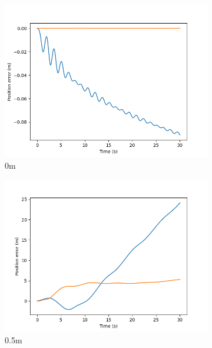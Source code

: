 \documentclass[class=article, crop=false]{standalone}
\begin{document}
\begin{figure}
    \centering
    \begin{subfigure}[b]{0.48\textwidth}
        \centering
        \includegraphics{scenario1/rov-100m/0.0m/usv_pos_error_uncontrolled}
        \caption{0m}
        \label{}
    \end{subfigure}
    \hfill
        \begin{subfigure}[b]{0.48\textwidth}
        \centering
        \includegraphics{scenario1/rov-100m/0.5m/usv_pos_error_uncontrolled}
        \caption{0.5m}
        \label{}
    \end{subfigure}
    \vfill
        \begin{subfigure}[b]{0.48\textwidth}
        \centering

\end{subfigure}
\end{figure}
\end{document}
